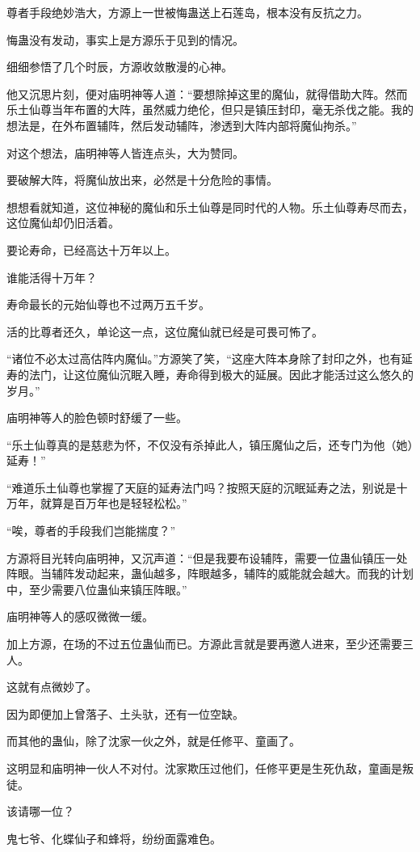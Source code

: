 \begin{this_body}
尊者手段绝妙浩大，方源上一世被悔蛊送上石莲岛，根本没有反抗之力。

悔蛊没有发动，事实上是方源乐于见到的情况。

细细参悟了几个时辰，方源收敛散漫的心神。

他又沉思片刻，便对庙明神等人道：“要想除掉这里的魔仙，就得借助大阵。然而乐土仙尊当年布置的大阵，虽然威力绝伦，但只是镇压封印，毫无杀伐之能。我的想法是，在外布置辅阵，然后发动辅阵，渗透到大阵内部将魔仙拘杀。”

对这个想法，庙明神等人皆连点头，大为赞同。

要破解大阵，将魔仙放出来，必然是十分危险的事情。

想想看就知道，这位神秘的魔仙和乐土仙尊是同时代的人物。乐土仙尊寿尽而去，这位魔仙却仍旧活着。

要论寿命，已经高达十万年以上。

谁能活得十万年？

寿命最长的元始仙尊也不过两万五千岁。

活的比尊者还久，单论这一点，这位魔仙就已经是可畏可怖了。

“诸位不必太过高估阵内魔仙。”方源笑了笑，“这座大阵本身除了封印之外，也有延寿的法门，让这位魔仙沉眠入睡，寿命得到极大的延展。因此才能活过这么悠久的岁月。”

庙明神等人的脸色顿时舒缓了一些。

“乐土仙尊真的是慈悲为怀，不仅没有杀掉此人，镇压魔仙之后，还专门为他（她）延寿！”

“难道乐土仙尊也掌握了天庭的延寿法门吗？按照天庭的沉眠延寿之法，别说是十万年，就算是百万年也是轻轻松松。”

“唉，尊者的手段我们岂能揣度？”

方源将目光转向庙明神，又沉声道：“但是我要布设辅阵，需要一位蛊仙镇压一处阵眼。当辅阵发动起来，蛊仙越多，阵眼越多，辅阵的威能就会越大。而我的计划中，至少需要八位蛊仙来镇压阵眼。”

庙明神等人的感叹微微一缓。

加上方源，在场的不过五位蛊仙而已。方源此言就是要再邀人进来，至少还需要三人。

这就有点微妙了。

因为即便加上曾落子、土头驮，还有一位空缺。

而其他的蛊仙，除了沈家一伙之外，就是任修平、童画了。

这明显和庙明神一伙人不对付。沈家欺压过他们，任修平更是生死仇敌，童画是叛徒。

该请哪一位？

鬼七爷、化蝶仙子和蜂将，纷纷面露难色。


\end{this_body}
